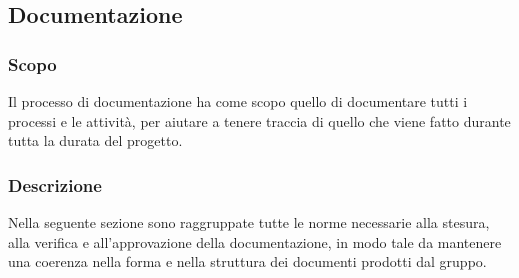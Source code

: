 \subsection{Documentazione}

\subsubsection{Scopo}
Il processo di documentazione ha come scopo quello di documentare tutti i processi e le attività, 
per aiutare a tenere traccia di quello che viene fatto durante tutta la durata del progetto. 

\subsubsection{Descrizione}
Nella seguente sezione sono raggruppate tutte le norme necessarie alla stesura, alla verifica e 
all’approvazione della documentazione, in modo tale da mantenere una coerenza nella forma e nella 
struttura dei documenti prodotti dal gruppo.






